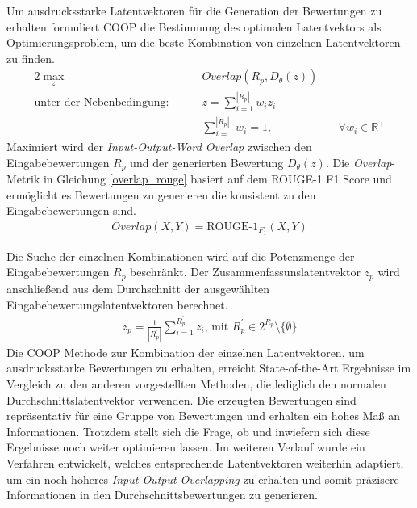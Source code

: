 Um ausdrucksstarke Latentvektoren für die Generation der Bewertungen zu erhalten formuliert COOP \citep{coop} die Bestimmung des optimalen Latentvektors als Optimierungsproblem, um die beste Kombination von einzelnen Latentvektoren zu finden.
\begin{alignat}{2}
    \max_z              &\quad&  Overlap(R_p, D_\theta(z))    & \\
    \text{unter der Nebenbedingung: } &\quad&  z = \sum_{i=1}^{|R_p|} w_i z_i \\
                         &\quad&  \sum_{i=1}^{|R_p|}w_i=1,                        &\quad \forall w_i \in \mathbb{R}^+
\end{alignat}
Maximiert wird der \textit{Input-Output-Word Overlap} zwischen den Eingabebewertungen $R_p$ und der generierten Bewertung $D_\theta(z)$. 
Die \textit{Overlap}-Metrik in Gleichung \ref{overlap_rouge} basiert auf dem ROUGE-1 F1 Score und ermöglicht es Bewertungen zu generieren die konsistent zu den Eingabebewertungen sind.
\begin{align}
    \label{overlap_rouge}
    Overlap(X,Y) = \text{ROUGE-1}_{F_1}(X,Y)
\end{align}

Die Suche der einzelnen Kombinationen wird auf die Potenzmenge der Eingabebewertungen $R_p$ beschränkt. 
Der Zusammenfassunslatentvektor $z_p$ wird anschließend aus dem Durchschnitt der ausgewählten Eingabebewertungslatentvektoren berechnet.
\begin{align}
z_p = \frac{1}{|R_p^{'}|} \sum_{i=1}^{R_p^{'}}z_i \text{, mit } R_p^{'} \in 2^{R_p} \setminus  \{ \emptyset\}
\end{align}
Die COOP Methode zur Kombination der einzelnen Latentvektoren, um ausdrucksstarke Bewertungen zu erhalten, erreicht State-of-the-Art Ergebnisse im Vergleich zu den anderen vorgestellten Methoden, die lediglich den normalen Durchschnittslatentvektor verwenden.
Die erzeugten Bewertungen sind repräsentativ für eine Gruppe von Bewertungen und erhalten ein hohes Maß an Informationen. 
Trotzdem stellt sich die Frage, ob und inwiefern sich diese Ergebnisse noch weiter optimieren lassen.
Im weiteren Verlauf wurde ein Verfahren entwickelt, welches entsprechende Latentvektoren weiterhin adaptiert, um ein noch höheres \textit{Input-Output-Overlapping} zu erhalten und somit präzisere Informationen in den Durchschnittsbewertungen zu generieren.

\pagebreak
